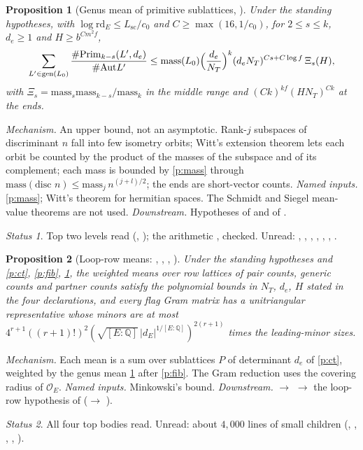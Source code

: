 \documentclass[11pt]{article}
\newcommand{\Ok}{\mathcal O}
\newcommand{\rd}{\mathrm{rd}}
\newtheorem{prop}{Proposition}
\theoremstyle{remark}
\newtheorem*{status}{Status}
\begin{document}
\begin{prop}[Genus mean of primitive sublattices, ]\label{p:mean}
Under the standing hypotheses, with $\log\rd_E\le L_{\mathrm{sc}}/c_0$ and $C\ge\max(16,1/c_0)$, for $2\le s\le k$, $d_e\ge1$ and $H\ge b^{Cm^2f}$,
\[
\sum_{L'\in\mathrm{gen}(L_0)}\frac{\#\mathrm{Prim}_{k-s}(L',d_e)}{\#\mathrm{Aut}L'}\le\mathrm{mass}(L_0)\Bigl(\frac{d_e}{N_T}\Bigr)^{k}(d_eN_T)^{Cs+C\log f}\,\Xi_s(H),
\]
with $\Xi_s=\mathrm{mass}_s\mathrm{mass}_{k-s}/\mathrm{mass}_k$ in the middle range and $(Ck)^{kf}(HN_T)^{Ck}$ at the ends.
\end{prop}
\emph{Mechanism.} An upper bound, not an asymptotic. Rank-$j$ subspaces of discriminant $n$ fall into few isometry orbits; Witt's extension theorem lets each orbit be counted by the product of the masses of the subspace and of its complement; each mass is bounded by \ref{p:mass} through $\mathrm{mass}(\text{disc }n)\le\mathrm{mass}_j\,n^{(j+l)/2}$; the ends are short-vector counts.
\emph{Named inputs.} \ref{p:mass}; Witt's theorem for hermitian spaces. The Schmidt and Siegel mean-value theorems are not used.
\emph{Downstream.} Hypotheses  of  and  of .
\begin{status}Top two levels read (, ); the arithmetic ,  checked. Unread: , , , , , , .\end{status}

\begin{prop}[Loop-row means: , , , ]\label{p:loop}
Under the standing hypotheses and \ref{p:ct}, \ref{p:fib}, \ref{p:mean}, the weighted means over row lattices of pair counts, generic counts and partner counts satisfy the polynomial bounds in $N_T$, $d_e$, $H$ stated in the four declarations, and every flag Gram matrix has a unitriangular representative whose minors are at most $4^{r+1}((r+1)!)^2(\sqrt{[E:\mathbb Q]}\,|d_E|^{1/[E:\mathbb Q]})^{2(r+1)}$ times the leading-minor sizes.
\end{prop}
\emph{Mechanism.} Each mean is a sum over sublattices $P$ of determinant $d_e$ of \ref{p:ct}, weighted by the genus mean \ref{p:mean} after \ref{p:fib}. The Gram reduction uses the covering radius of $\Ok_E$.
\emph{Named inputs.} Minkowski's bound.
\emph{Downstream.}  $\to$  $\to$ the loop-row hypothesis  of  ($\to$ ).
\begin{status}All four top bodies read. Unread: about $4{,}000$ lines of small children (, , , , ).\end{status}
\end{document}
